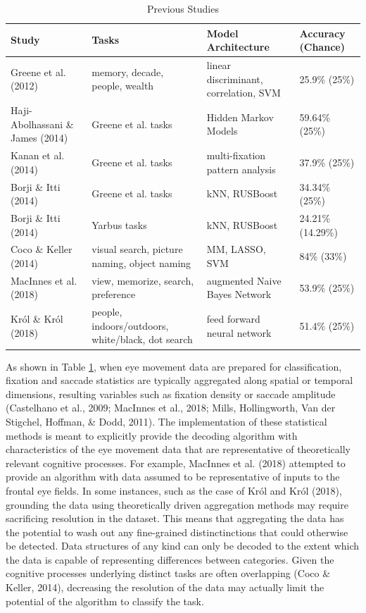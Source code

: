 \documentclass[
  english,
  man,floatsintext]{apa6}
\begin{document}
\begin{table}[h]
    \centering
    \caption{Previous Studies}
    \label{tab:previous-studies}
    \begin{tabular}{p{.23\linewidth} p{.23\linewidth} p{.23\linewidth} p{.23\linewidth}}
        Study & Tasks & Model Architecture & Accuracy (Chance) \\
        \hline
        Greene et al. (2012) & memory, decade, people, wealth & linear discriminant, correlation, SVM & 25.9\% (25\%) \\
        Haji-Abolhassani \& James (2014)  & Greene et al. tasks & Hidden Markov Models & 59.64\% (25\%) \\
        Kanan et al. (2014) & Greene et al. tasks & multi-fixation pattern analysis & 37.9\% (25\%) \\
        Borji \& Itti (2014)  & Greene et al. tasks & kNN, RUSBoost & 34.34\% (25\%) \\
        Borji \& Itti (2014) & Yarbus tasks & kNN, RUSBoost & 24.21\% (14.29\%) \\
        Coco \& Keller (2014) & visual search, picture naming, object naming & MM, LASSO, SVM & 84\% (33\%) \\
        MacInnes et al. (2018) & view, memorize, search, preference & augmented Naive Bayes Network & 53.9\% (25\%) \\
        Król \& Król (2018) & people, indoors/outdoors, white/black, dot search & feed forward neural network & 51.4\% (25\%) \\
        \hline
    \end{tabular}
\end{table}

As shown in Table \ref{tab:previous-studies}, when eye movement data are prepared for classification, fixation and saccade statistics are typically aggregated along spatial or temporal dimensions, resulting variables such as fixation density or saccade amplitude (Castelhano et al., 2009; MacInnes et al., 2018; Mills, Hollingworth, Van der Stigchel, Hoffman, \& Dodd, 2011). The implementation of these statistical methods is meant to explicitly provide the decoding algorithm with characteristics of the eye movement data that are representative of theoretically relevant cognitive processes. For example, MacInnes et al. (2018) attempted to provide an algorithm with data assumed to be representative of inputs to the frontal eye fields. In some instances, such as the case of Król and Król (2018), grounding the data using theoretically driven aggregation methods may require sacrificing resolution in the dataset. This means that aggregating the data has the potential to wash out any fine-grained distinctinctions that could otherwise be detected. Data structures of any kind can only be decoded to the extent which the data is capable of representing differences between categories. Given the cognitive processes underlying distinct tasks are often overlapping (Coco \& Keller, 2014), decreasing the resolution of the data may actually limit the potential of the algorithm to classify the task.
\end{document}
